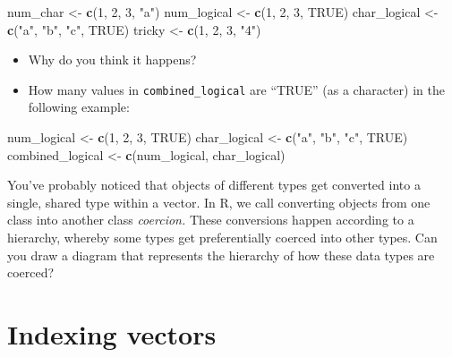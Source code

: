 \documentclass[]{book}
\newenvironment{Shaded}{\begin{snugshade}}{\end{snugshade}}
\newcommand{\DecValTok}[1]{\textcolor[rgb]{0.00,0.00,0.81}{#1}}
\newcommand{\KeywordTok}[1]{\textcolor[rgb]{0.13,0.29,0.53}{\textbf{#1}}}
\newcommand{\NormalTok}[1]{#1}
\newcommand{\OtherTok}[1]{\textcolor[rgb]{0.56,0.35,0.01}{#1}}
\newcommand{\StringTok}[1]{\textcolor[rgb]{0.31,0.60,0.02}{#1}}
\begin{document}
\begin{Shaded}
\begin{Highlighting}[]
\NormalTok{num_char <-}\StringTok{ }\KeywordTok{c}\NormalTok{(}\DecValTok{1}\NormalTok{, }\DecValTok{2}\NormalTok{, }\DecValTok{3}\NormalTok{, }\StringTok{"a"}\NormalTok{)}
\NormalTok{num_logical <-}\StringTok{ }\KeywordTok{c}\NormalTok{(}\DecValTok{1}\NormalTok{, }\DecValTok{2}\NormalTok{, }\DecValTok{3}\NormalTok{, }\OtherTok{TRUE}\NormalTok{)}
\NormalTok{char_logical <-}\StringTok{ }\KeywordTok{c}\NormalTok{(}\StringTok{"a"}\NormalTok{, }\StringTok{"b"}\NormalTok{, }\StringTok{"c"}\NormalTok{, }\OtherTok{TRUE}\NormalTok{)}
\NormalTok{tricky <-}\StringTok{ }\KeywordTok{c}\NormalTok{(}\DecValTok{1}\NormalTok{, }\DecValTok{2}\NormalTok{, }\DecValTok{3}\NormalTok{, }\StringTok{"4"}\NormalTok{)}
\end{Highlighting}
\end{Shaded}

\begin{itemize}
\item
  Why do you think it happens?
\item
  How many values in \texttt{combined\_logical} are ``TRUE'' (as a character) in the following example:
\end{itemize}

\begin{Shaded}
\begin{Highlighting}[]
\NormalTok{num_logical <-}\StringTok{ }\KeywordTok{c}\NormalTok{(}\DecValTok{1}\NormalTok{, }\DecValTok{2}\NormalTok{, }\DecValTok{3}\NormalTok{, }\OtherTok{TRUE}\NormalTok{)}
\NormalTok{char_logical <-}\StringTok{ }\KeywordTok{c}\NormalTok{(}\StringTok{"a"}\NormalTok{, }\StringTok{"b"}\NormalTok{, }\StringTok{"c"}\NormalTok{, }\OtherTok{TRUE}\NormalTok{)}
\NormalTok{combined_logical <-}\StringTok{ }\KeywordTok{c}\NormalTok{(num_logical, char_logical)}
\end{Highlighting}
\end{Shaded}

You've probably noticed that objects of different types get converted into a single, shared type within a vector. In R, we call converting objects from one class into another class \emph{coercion.} These conversions happen according to a hierarchy, whereby some types get preferentially coerced into other types. Can you draw a diagram that represents the hierarchy of how these data types are coerced?

\hypertarget{indexing-vectors}{%
\section{Indexing vectors}\label{indexing-vectors}}
\end{document}
